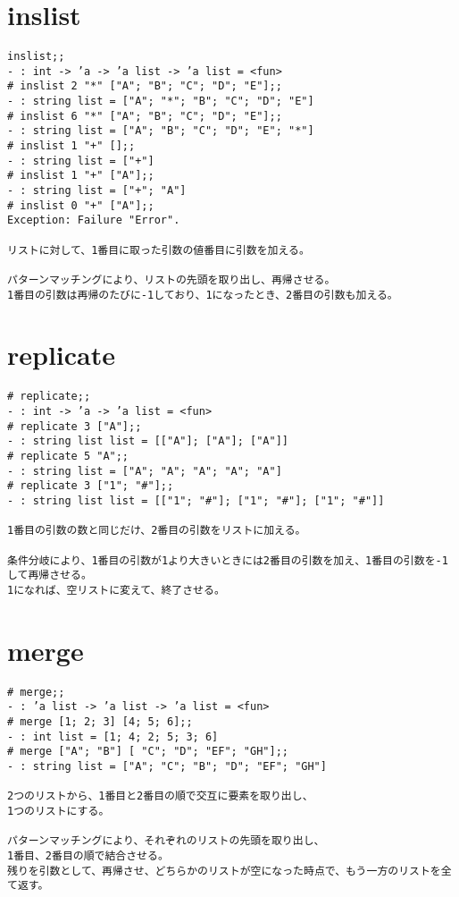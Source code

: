 \documentclass{jarticle}
\begin{document}
\newpage
\section{inslist}
\begin{verbatim}
inslist;; 
- : int -> ’a -> ’a list -> ’a list = <fun> 
# inslist 2 "*" ["A"; "B"; "C"; "D"; "E"];; 
- : string list = ["A"; "*"; "B"; "C"; "D"; "E"] 
# inslist 6 "*" ["A"; "B"; "C"; "D"; "E"];; 
- : string list = ["A"; "B"; "C"; "D"; "E"; "*"] 
# inslist 1 "+" [];; 
- : string list = ["+"] 
# inslist 1 "+" ["A"];; 
- : string list = ["+"; "A"] 
# inslist 0 "+" ["A"];; 
Exception: Failure "Error".

リストに対して、1番目に取った引数の値番目に引数を加える。

パターンマッチングにより、リストの先頭を取り出し、再帰させる。
1番目の引数は再帰のたびに-1しており、1になったとき、2番目の引数も加える。
\end{verbatim}

\newpage
\section{replicate}
\begin{verbatim}
# replicate;; 
- : int -> ’a -> ’a list = <fun> 
# replicate 3 ["A"];; 
- : string list list = [["A"]; ["A"]; ["A"]] 
# replicate 5 "A";; 
- : string list = ["A"; "A"; "A"; "A"; "A"] 
# replicate 3 ["1"; "#"];; 
- : string list list = [["1"; "#"]; ["1"; "#"]; ["1"; "#"]]

1番目の引数の数と同じだけ、2番目の引数をリストに加える。

条件分岐により、1番目の引数が1より大きいときには2番目の引数を加え、1番目の引数を-1して再帰させる。
1になれば、空リストに変えて、終了させる。
\end{verbatim}

\newpage
\section{merge}
\begin{verbatim}
# merge;; 
- : ’a list -> ’a list -> ’a list = <fun> 
# merge [1; 2; 3] [4; 5; 6];; 
- : int list = [1; 4; 2; 5; 3; 6] 
# merge ["A"; "B"] [ "C"; "D"; "EF"; "GH"];; 
- : string list = ["A"; "C"; "B"; "D"; "EF"; "GH"]

2つのリストから、1番目と2番目の順で交互に要素を取り出し、
1つのリストにする。

パターンマッチングにより、それぞれのリストの先頭を取り出し、
1番目、2番目の順で結合させる。
残りを引数として、再帰させ、どちらかのリストが空になった時点で、もう一方のリストを全て返す。
\end{verbatim}
\end{document}

